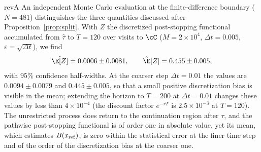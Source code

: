 \begin{rv}{revA}{}
An independent Monte Carlo evaluation at the finite-difference boundary ($N=481$) distinguishes the
three quantities discussed after Proposition~\ref{prop:split}. With $Z$ the discretized post-stopping
functional accumulated from $\hat\tau$ to $T=120$ over visits to $\cC$ ($M=2\times10^4$,
$\Delta t=0.005$, $\varepsilon=\sqrt{\Delta t}$), we find
\[
\hat\E[Z]=0.0006\pm0.0081,\qquad\hat\E|Z|=0.455\pm0.005 ,
\]
with $95\%$ confidence half-widths. At the coarser step $\Delta t=0.01$ the values are
$0.0094\pm0.0079$ and $0.445\pm0.005$, so that a small positive discretization bias is visible in
the mean; extending the horizon to $T=200$ at $\Delta t=0.01$ changes these values by less than
$4\times10^{-4}$ (the discount factor $e^{-rT}$ is $2.5\times10^{-3}$ at $T=120$). The unrestricted process
does return to the continuation region after $\tau$, and the pathwise post-stopping functional is of
order one in absolute value, yet its mean, which estimates $B(x_{\rm ref})$, is zero within the statistical error at the finer
time step and of the order of the discretization bias at the coarser one. 
\end{rv}

